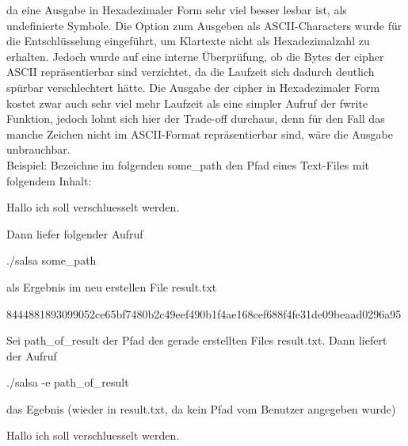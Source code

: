 \documentclass[course=erap]{aspdoc}
\begin{document}
 da eine Ausgabe in Hexadezimaler Form sehr viel besser lesbar ist, als undefinierte Symbole. Die Option zum Ausgeben als ASCII-Characters wurde für die Entschlüsselung eingeführt, um Klartexte nicht als Hexadezimalzahl zu erhalten. Jedoch wurde auf eine interne Überprüfung, ob die Bytes der cipher
ASCII repräsentierbar sind verzichtet, da die Laufzeit sich dadurch deutlich spürbar verschlechtert hätte. Die Ausgabe der cipher in Hexadezimaler Form kostet zwar auch sehr viel mehr Laufzeit als eine simpler Aufruf der fwrite Funktion, jedoch lohnt sich hier der Trade-off durchaus, 
denn für den Fall das manche Zeichen nicht im ASCII-Format repräsentierbar sind, wäre die Ausgabe unbrauchbar.
\\Beispiel: Bezeichne im folgenden some\_path den Pfad eines Text-Files mit folgendem Inhalt:
\begin{center}
    Hallo ich soll verschluesselt werden.
\end{center}
Dann liefer folgender Aufruf
\begin{center}
    ./salsa some\_path
\end{center}
als Ergebnis im neu erstellen File result.txt
\begin{center}
    8444881893099052ce65bf7480b2c49eef490b1f4ae168cef688f4fe31de09beaad0296a95
\end{center}
Sei path\_of\_result der Pfad des gerade erstellten Files result.txt. Dann liefert der Aufruf
\begin{center}
   ./salsa -e path\_of\_result
\end{center}
das Egebnis (wieder in result.txt, da kein Pfad vom Benutzer angegeben wurde)
\begin{center}
    Hallo ich soll verschluesselt werden.
\end{center}
\end{document}
